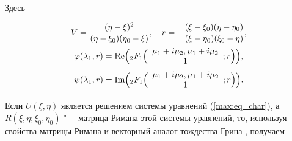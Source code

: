 Здесь

\begin{gather*}

V=\frac{(\eta-\xi)^2}{(\eta-\xi_0)(\eta_0-\xi)},\quad  r=-\frac{(\xi-\xi_0)(\eta-\eta_0)}{(\xi-\eta_0)(\xi_0-\eta)},

\notag

\\

\varphi(\lambda_1,r)= \text{Re}\Bigl({}_2F_1\Bigl( 

\begin{array}{c}

 \mu_1+i \mu_2, \mu_1+i\mu_2 \\

1

\end{array};

r

\Bigr) \Bigr),  

\\

  \psi(\lambda_1,r)= \text{Im} \Bigl({}_2F_1\Bigl( 

\begin{array}{c}

 \mu_1+i \mu_2, \mu_1+i\mu_2 \\

1

\end{array};

r

\Bigr) \Bigr).

\end{gather*}



Если $U(\xi,\eta)$ является решением системы уравнений (\ref{max:eq_char}), а $R(\xi,\eta;\xi_0,\eta_0)$ "--- матрица Римана этой системы уравнений, то, используя свойства матрицы Римана и векторный аналог тождества Грина \cite{mix:bic}, получаем

